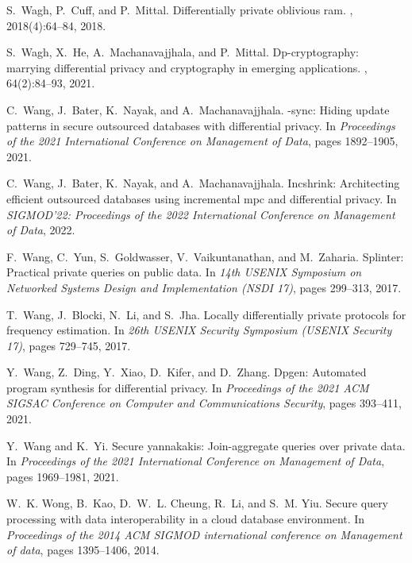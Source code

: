 \documentclass[11pt]{article}
\begin{document}
\begin{thebibliography}{140}
\begin{small}
S.~Wagh, P.~Cuff, and P.~Mittal.
\newblock Differentially private oblivious ram.
, 2018(4):64--84,
  2018.

S.~Wagh, X.~He, A.~Machanavajjhala, and P.~Mittal.
\newblock Dp-cryptography: marrying differential privacy and cryptography in
  emerging applications.
, 64(2):84--93, 2021.

C.~Wang, J.~Bater, K.~Nayak, and A.~Machanavajjhala.
-sync: Hiding update patterns in secure outsourced databases with
  differential privacy.
\newblock In {\em Proceedings of the 2021 International Conference on
  Management of Data}, pages 1892--1905, 2021.

C.~Wang, J.~Bater, K.~Nayak, and A.~Machanavajjhala.
\newblock Incshrink: Architecting efficient outsourced databases using
  incremental mpc and differential privacy.
\newblock In {\em SIGMOD'22: Proceedings of the 2022 International Conference
  on Management of Data}, 2022.

F.~Wang, C.~Yun, S.~Goldwasser, V.~Vaikuntanathan, and M.~Zaharia.
\newblock Splinter: Practical private queries on public data.
\newblock In {\em 14th USENIX Symposium on Networked Systems Design and
  Implementation (NSDI 17)}, pages 299--313, 2017.

T.~Wang, J.~Blocki, N.~Li, and S.~Jha.
\newblock Locally differentially private protocols for frequency estimation.
\newblock In {\em 26th USENIX Security Symposium (USENIX Security 17)}, pages
  729--745, 2017.

Y.~Wang, Z.~Ding, Y.~Xiao, D.~Kifer, and D.~Zhang.
\newblock Dpgen: Automated program synthesis for differential privacy.
\newblock In {\em Proceedings of the 2021 ACM SIGSAC Conference on Computer and
  Communications Security}, pages 393--411, 2021.

Y.~Wang and K.~Yi.
\newblock Secure yannakakis: Join-aggregate queries over private data.
\newblock In {\em Proceedings of the 2021 International Conference on
  Management of Data}, pages 1969--1981, 2021.

W.~K. Wong, B.~Kao, D.~W.~L. Cheung, R.~Li, and S.~M. Yiu.
\newblock Secure query processing with data interoperability in a cloud
  database environment.
\newblock In {\em Proceedings of the 2014 ACM SIGMOD international conference
  on Management of data}, pages 1395--1406, 2014.


\end{small}
\end{thebibliography}
\end{document}
